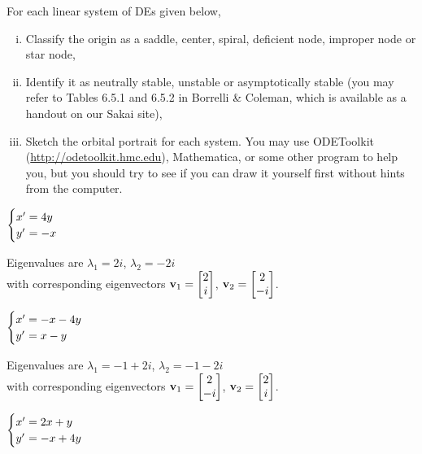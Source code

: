 \documentclass[boxes]{gsypset}
\begin{document}
\begin{problem}
	For each linear system of DEs given below,
	\begin{enumerate}[(i)]
		\item Classify the origin as a saddle, center, spiral, deficient node, improper node or
		  star node,
		\item Identify it as neutrally stable, unstable or asymptotically
		  stable (you may refer to Tables 6.5.1 and 6.5.2 in Borrelli \& Coleman, which is available as a handout on our Sakai site),
		\item Sketch the orbital portrait for each system. You may use
		  ODEToolkit (\url{http://odetoolkit.hmc.edu}), Mathematica, or some
		  other program to help you, but you should try to see if you can draw
		  it yourself first without hints from the computer.
	\end{enumerate}
	\begin{subproblems}
		\subproblem 
			$\begin{cases}
				x'&\hspace{-.1in}=4y \\
				y'&\hspace{-.1in}=-x
			\end{cases}$
			
			Eigenvalues are $\lambda_1 = 2i$, $\lambda_2=-2i$ \\
			with corresponding eigenvectors $\mathbf{v}_1 = \begin{bmatrix}2 \\ i\end{bmatrix}$, $\mathbf{v}_2 = \begin{bmatrix}2 \\ -i\end{bmatrix}$.
			\begin{solution}
				
			\end{solution}
		\subproblem 
			$\begin{cases}
				x'&\hspace{-.1in}=-x-4y \\
				y'&\hspace{-.1in}=x-y
			\end{cases}$
			
			Eigenvalues are $\lambda_1 =-1+2i$, $\lambda_2 =-1-2i$ \\
			with corresponding eigenvectors $\mathbf{v}_1 = \begin{bmatrix}2 \\ -i\end{bmatrix}$, $\mathbf{v}_2 = \begin{bmatrix}2 \\ i\end{bmatrix}$.
			\begin{solution}
				
			\end{solution}
		\subproblem 
			$\begin{cases}
				x'&\hspace{-.1in}=2x+y \\
				y'&\hspace{-.1in}=-x+4y
			\end{cases}$
			

\end{subproblems}
\end{problem}
\end{document}
